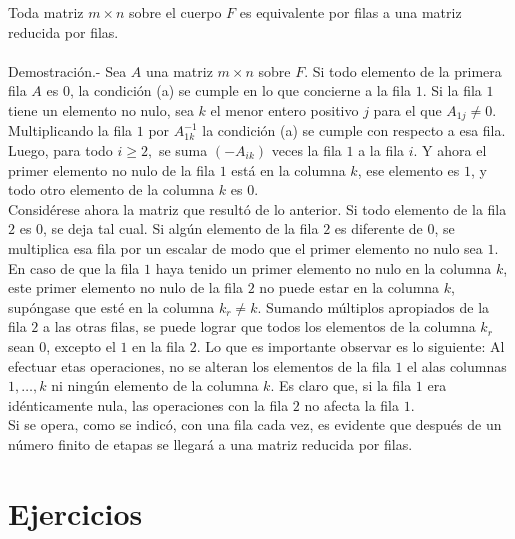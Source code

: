 \begin{teo}
    Toda matriz $m\times n$ sobre el cuerpo $F$ es equivalente por filas a una matriz reducida por filas.\\\\
    Demostración.-\; Sea $A$ una matriz $m\times n$ sobre $F$. Si todo elemento de la primera fila $A$ es $0$, la condición (a) se cumple en lo que concierne a la fila $1$. Si la fila $1$ tiene un elemento no nulo, sea $k$ el menor entero positivo $j$ para el que $A_{1j}\neq 0$. Multiplicando la fila $1$ por $A_{1k}^{-1}$ la condición (a) se cumple con respecto a esa fila. Luego, para todo $i\geq 2,$ se suma $(-A_{ik})$ veces la fila $1$  a la fila $i$. Y ahora el primer elemento no nulo de la fila $1$ está en la columna $k$, ese elemento es $1$, y todo otro elemento de la columna $k$ es $0$.\\
    Considérese ahora la matriz que resultó de lo anterior. Si todo elemento de la fila $2$ es $0$, se deja tal cual. Si algún elemento de la fila $2$ es diferente de $0$, se multiplica esa fila por un escalar de modo que el primer elemento no nulo sea $1$. En caso de que la fila $1$ haya tenido un primer elemento no nulo en la columna $k$, este primer elemento no nulo de la fila $2$ no puede estar en la columna $k$, supóngase que esté en la columna $k_r\neq k$. Sumando múltiplos apropiados de la fila $2$ a las otras filas, se puede lograr que todos los elementos de la columna $k_r$ sean $0$, excepto el $1$ en la fila $2$. Lo que es importante observar es lo siguiente: Al efectuar etas operaciones, no se alteran los elementos de la fila $1$ el alas columnas $1,\ldots, k$ ni ningún elemento de la columna $k$. Es claro que, si la fila $1$ era idénticamente nula, las operaciones con la fila $2$ no afecta la fila $1$.\\
    Si se opera, como se indicó, con una fila cada vez, es evidente que después de un número finito de etapas se llegará a una matriz reducida por filas.
\end{teo}

\section*{Ejercicios}

